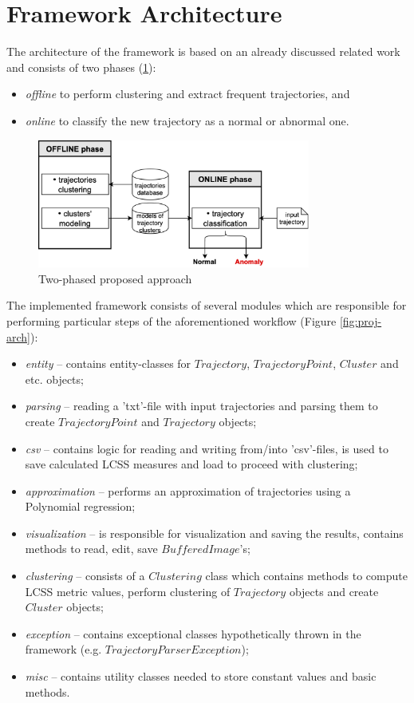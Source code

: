 \section{Framework Architecture}

The architecture of the framework is based on an already discussed related work \cite{inproceedings:7_related_work} and consists of two phases (\ref{fig:str}):

\begin{itemize}
	\item \textit{offline} to perform clustering and extract frequent trajectories, and
	\item \textit{online} to classify the new trajectory as a normal or abnormal one.
\end{itemize}

\begin{figure}[!htb]
	\centering{}
	\includegraphics[width=0.8\textwidth]{images/str.png}
	\caption{Two-phased proposed approach}
	\label{fig:str}
\end{figure}

The implemented framework consists of several modules which are responsible for performing particular steps of the aforementioned workflow (Figure \ref{fig:proj-arch}):
\begin{itemize}
	\item \textit{entity} -- contains entity-classes for $Trajectory$, $TrajectoryPoint$, $Cluster$ and etc. objects;
	\item \textit{parsing} -- reading a 'txt'-file with input trajectories and parsing them to create $TrajectoryPoint$ and $Trajectory$ objects;
	\item \textit{csv} -- contains logic for reading and writing from/into 'csv'-files, is used to save calculated LCSS measures and load to proceed with clustering;
	\item \textit{approximation} -- performs an approximation of trajectories using a Polynomial regression;
	\item \textit{visualization} -- is responsible for visualization and saving the results, contains methods to read, edit, save $BufferedImage$'s;
	\item \textit{clustering} -- consists of a $Clustering$ class which contains methods to compute LCSS metric values, perform clustering of $Trajectory$ objects and create $Cluster$ objects;
	\item \textit{exception} -- contains exceptional classes hypothetically thrown in the framework (e.g. $TrajectoryParserException$);
	\item \textit{misc} -- contains utility classes needed to store constant values and basic methods.
\end{itemize}

